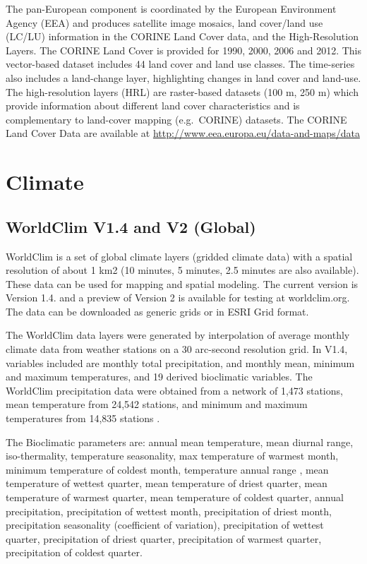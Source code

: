 \documentclass[10pt,b5paper,]{book}
\theoremstyle{definition}
\theoremstyle{definition}
\theoremstyle{definition}
\theoremstyle{remark}
\begin{document}
The pan-European component is coordinated by the European Environment
Agency (EEA) and produces satellite image mosaics, land cover/land use
(LC/LU) information in the CORINE Land Cover data, and the
High-Resolution Layers. The CORINE Land Cover is provided for 1990,
2000, 2006 and 2012. This vector-based dataset includes 44 land cover
and land use classes. The time-series also includes a land-change layer,
highlighting changes in land cover and land-use. The high-resolution
layers (HRL) are raster-based datasets (100 m, 250 m) which provide
information about different land cover characteristics and is
complementary to land-cover mapping (e.g.~CORINE) datasets. The CORINE
Land Cover Data are available at
\url{http://www.eea.europa.eu/data-and-maps/data}

\hypertarget{climate}{%
\section{Climate}\label{climate}}

\hypertarget{worldclim-v1.4-and-v2-global}{%
\subsection{WorldClim V1.4 and V2
(Global)}\label{worldclim-v1.4-and-v2-global}}

WorldClim is a set of global climate layers (gridded climate data) with
a spatial resolution of about 1 km2 (10 minutes, 5 minutes, 2.5 minutes
are also available). These data can be used for mapping and spatial
modeling. The current version is Version 1.4. and a preview of Version 2
is available for testing at worldclim.org. The data can be downloaded as
generic grids or in ESRI Grid format.

The WorldClim data layers were generated by interpolation of average
monthly climate data from weather stations on a 30 arc-second resolution
grid. In V1.4, variables included are monthly total precipitation, and
monthly mean, minimum and maximum temperatures, and 19 derived
bioclimatic variables. The WorldClim precipitation data were obtained
from a network of 1,473 stations, mean temperature from 24,542 stations,
and minimum and maximum temperatures from 14,835 stations
\citep{hijmans2005very}.

The Bioclimatic parameters are: annual mean temperature, mean diurnal
range, iso-thermality, temperature seasonality, max temperature of
warmest month, minimum temperature of coldest month, temperature annual
range , mean temperature of wettest quarter, mean temperature of driest
quarter, mean temperature of warmest quarter, mean temperature of
coldest quarter, annual precipitation, precipitation of wettest month,
precipitation of driest month, precipitation seasonality (coefficient of
variation), precipitation of wettest quarter, precipitation of driest
quarter, precipitation of warmest quarter, precipitation of coldest
quarter.
\end{document}
